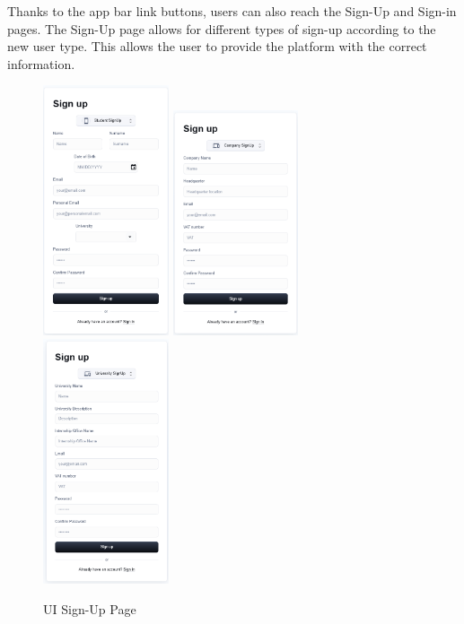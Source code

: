 \noindent Thanks to the app bar link buttons, users can also reach the Sign-Up and Sign-in pages. The Sign-Up page allows for different types of sign-up according to the new user type. This allows the user to provide the platform with the correct information.
\begin{figure}[H]
    \includegraphics[width=0.33\textwidth]{Latex/Images/UI/v2/SignUp Student.png}
    \includegraphics[width=0.33\textwidth]{Latex/Images/UI/v2/SignUp Company.png}
    \includegraphics[width=0.33\textwidth]{Latex/Images/UI/v2/SignUp University.png}
    \caption{UI Sign-Up Page}
    \label{fig:signuppage}
\end{figure}
